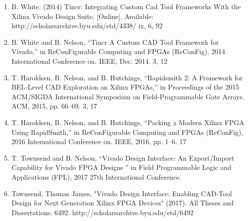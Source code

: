 \begin{enumerate}
  \item B. White. (2014) Tincr: Integrating Custom Cad Tool Frameworks With the
  Xilinx Vivado Design Suite. [Online]. Available:
  http://scholarsarchive.byu.edu/etd/4338/ ix, 6, 92
  
  \item B. White and B. Nelson, “Tincr A Custom CAD Tool Framework for Vivado,”
  in ReConFigurable Computing and FPGAs (ReConFig), 2014 International
  Conference on. IEEE, Dec. 2014. 3, 12 
   
  \item T. Haroldsen, B. Nelson, and B. Hutchings, “Rapidsmith 2: A Framework
  for BEL-Level CAD Exploration on Xilinx FPGAs,” in Proceedings of the 2015
  ACM/SIGDA International Symposium on Field-Programmable Gate Arrays. ACM,
  2015, pp. 66–69. 3, 17
  
  \item  T. Haroldsen, B. Nelson, and B. Hutchings, “Packing a Modern Xilinx
  FPGA Using RapidSmith,” in ReConFigurable Computing and FPGAs (ReConFig),
  2016 International Conference on. IEEE, 2016, pp. 1–6. 17
  
  \item T. Townsend and B. Nelson, “Vivado Design Interface: An Export/Import
  Capability for Vivado FPGA Designs ” in Field Programmable Logic and
  Applications (FPL), 2017 27th International Conference.
  
  \item Townsend, Thomas James, "Vivado Design Interface: Enabling CAD-Tool
  Design for Next Generation Xilinx FPGA Devices" (2017). All Theses and
  Dissertations. 6492. http://scholarsarchive.byu.edu/etd/6492 
\end{enumerate}

